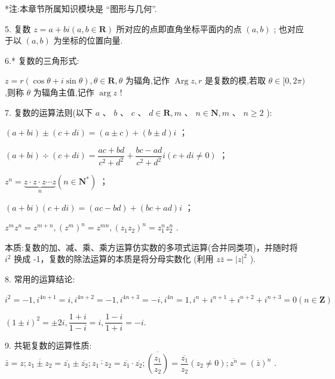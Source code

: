 *注:本章节所属知识模块是 “图形与几何”.



5. 复数 $z = a + b{i}\left( {a,b \in  \mathbf{R}}\right)$ 所对应的点即直角坐标平面内的点 $\left( {a,b}\right)$ ; 也对应于以 $\left( {a,b}\right)$ 为坐标的位置向量.

6.* 复数的三角形式:

$z = r\left( {\cos \theta  + {i}\sin \theta }\right) ,\theta  \in  \mathbf{R},\theta$ 为辐角,记作 $\operatorname{Arg}z,r$ 是复数的模,若取 $\theta  \in  \lbrack 0,{2\pi })$ ,则称 $\theta$ 为辐角主值,记作 $\arg z$ !

7. 复数的运算法则(以下 $a$ 、 $b$ 、 $c$ 、 $d \in  \mathbf{R},m$ 、 $n \in  \mathbf{N},m$ 、 $n \geq  2$ ):

   $\left( {a + b{i}}\right)  \pm  \left( {c + d{i}}\right)  = \left( {a \pm  c}\right)  + \left( {b \pm  d}\right) {i}$ ；

   $\left( {a + b{i}}\right)  \div  \left( {c + d{i}}\right)  = \dfrac{{ac} + {bd}}{{c}^{2} + {d}^{2}} + \dfrac{{bc} - {ad}}{{c}^{2} + {d}^{2}}{i}\left( {c + d{i} \neq  0}\right)$ ；

   ${z}^{n} = \underset{n}{\underbrace{z \cdot  z \cdot  z\cdots z}}\left( {n \in  {\mathbf{N}}^{ * }}\right)$ ；

   $\left( {a + b{i}}\right) \left( {c + d{i}}\right)  = \left( {{ac} - {bd}}\right)  + \left( {{bc} + {ad}}\right) {i}$ ；

   ${z}^{m}{z}^{n} = {z}^{m + n},{\left( {z}^{m}\right) }^{n} = {z}^{mn},{\left( {z}_{1}{z}_{2}\right) }^{n} = {z}_{1}^{n}{z}_{2}^{n}$ .

本质:复数的加、减、乘、乘方运算仿实数的多项式运算(合并同类项)，并随时将 ${{i}}^{2}$ 换成 -1，复数的除法运算的本质是将分母实数化 (利用 $z\bar{z} = {\left| z\right| }^{2}$ ).

8. 常用的运算结论:

${{i}}^{2} =  - 1,{{i}}^{{4n} + 1} = {i},{{i}}^{{4n} + 2} =  - 1,{{i}}^{{4n} + 3} =  - {i},{{i}}^{4n} = 1,{{i}}^{n} + {{i}}^{n + 1} + {{i}}^{n + 2} + {{i}}^{n + 3} = 0\left( {n \in  \mathbf{Z}}\right)$

${\left( 1 \pm  {i}\right) }^{2} =  \pm  2{i},\dfrac{1 + {i}}{1 - {i}} = {i},\dfrac{1 - {i}}{1 + {i}} =  - {i}.$

9. 共轭复数的运算性质: $\bar{z} = z;\overline{{z}_{1} \pm  {z}_{2}} = \overline{{z}_{1}} \pm  \overline{{z}_{2}};\overline{{z}_{1} \cdot  {z}_{2}} = \overline{{z}_{1}} \cdot  \overline{{z}_{2}};\overline{\left( \dfrac{{z}_{1}}{{z}_{2}}\right) } = \dfrac{\overline{{z}_{1}}}{{z}_{2}}\left( {{z}_{2} \neq  0}\right) ;\overline{{z}^{n}} = {\left( \bar{z}\right) }^{n}$ .

